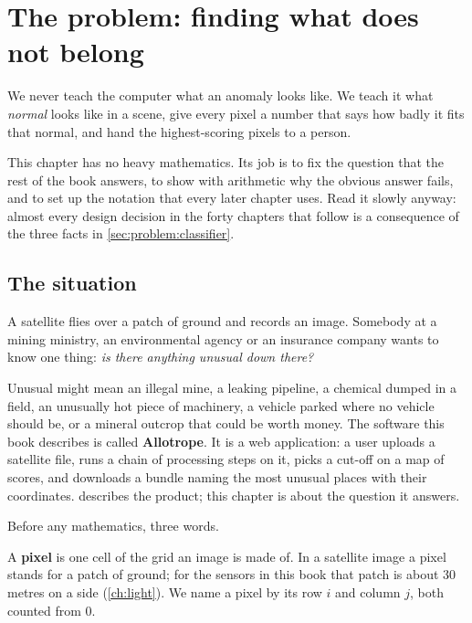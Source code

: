 \chapter{The problem: finding what does not belong}\label{ch:problem}

\begin{onething}
We never teach the computer what an anomaly looks like. We teach it what \emph{normal} looks like
in a scene, give every pixel a number that says how badly it fits that normal, and hand the
highest-scoring pixels to a person.
\end{onething}

This chapter has no heavy mathematics. Its job is to fix the question that the rest of the book
answers, to show with arithmetic why the obvious answer fails, and to set up the notation that
every later chapter uses. Read it slowly anyway: almost every design decision in the forty
chapters that follow is a consequence of the three facts in \cref{sec:problem:classifier}.

\section{The situation}\label{sec:problem:situation}

A satellite flies over a patch of ground and records an image. Somebody at a mining ministry, an
environmental agency or an insurance company wants to know one thing:
\emph{is there anything unusual down there?}

Unusual might mean an illegal mine, a leaking pipeline, a chemical dumped in a field, an
unusually hot piece of machinery, a vehicle parked where no vehicle should be, or a mineral
outcrop that could be worth money. The software this book describes is called
\textbf{Allotrope}. It is a web application: a user uploads a satellite file,
runs a chain of processing steps on it, picks a cut-off on a map of scores, and downloads a
bundle naming the most unusual places with their coordinates.  describes the
product; this chapter is about the question it answers.

Before any mathematics, three words.

\begin{definition}[Pixel]
A \textbf{pixel} is one cell of the grid an image is made of. In a satellite image a pixel
stands for a patch of ground; for the sensors in this book that patch is about 30 metres on a
side (\cref{ch:light}). We name a pixel by its row $i$ and column $j$, both counted from $0$.
\end{definition}

